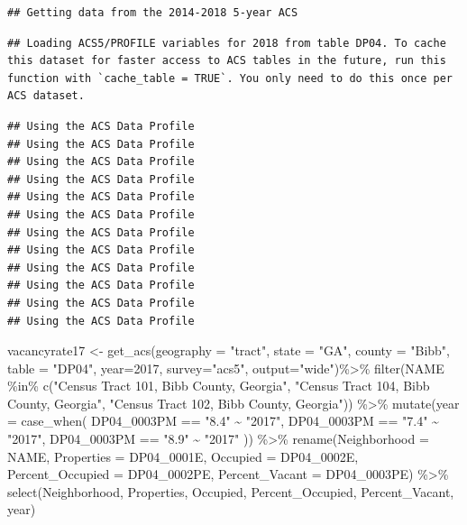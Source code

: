 \documentclass[
]{article}
\newenvironment{Shaded}{\begin{snugshade}}{\end{snugshade}}
\newcommand{\AttributeTok}[1]{\textcolor[rgb]{0.77,0.63,0.00}{#1}}
\newcommand{\DecValTok}[1]{\textcolor[rgb]{0.00,0.00,0.81}{#1}}
\newcommand{\FunctionTok}[1]{\textcolor[rgb]{0.00,0.00,0.00}{#1}}
\newcommand{\NormalTok}[1]{#1}
\newcommand{\OtherTok}[1]{\textcolor[rgb]{0.56,0.35,0.01}{#1}}
\newcommand{\SpecialCharTok}[1]{\textcolor[rgb]{0.00,0.00,0.00}{#1}}
\newcommand{\StringTok}[1]{\textcolor[rgb]{0.31,0.60,0.02}{#1}}
\begin{document}
\begin{verbatim}
## Getting data from the 2014-2018 5-year ACS
\end{verbatim}

\begin{verbatim}
## Loading ACS5/PROFILE variables for 2018 from table DP04. To cache this dataset for faster access to ACS tables in the future, run this function with `cache_table = TRUE`. You only need to do this once per ACS dataset.
\end{verbatim}

\begin{verbatim}
## Using the ACS Data Profile
## Using the ACS Data Profile
## Using the ACS Data Profile
## Using the ACS Data Profile
## Using the ACS Data Profile
## Using the ACS Data Profile
## Using the ACS Data Profile
## Using the ACS Data Profile
## Using the ACS Data Profile
## Using the ACS Data Profile
## Using the ACS Data Profile
## Using the ACS Data Profile
\end{verbatim}

\begin{Shaded}
\begin{Highlighting}[]
\NormalTok{vacancyrate17 }\OtherTok{\textless{}{-}} \FunctionTok{get\_acs}\NormalTok{(}\AttributeTok{geography =} \StringTok{"tract"}\NormalTok{, }\AttributeTok{state =} \StringTok{"GA"}\NormalTok{, }\AttributeTok{county =} \StringTok{"Bibb"}\NormalTok{, }\AttributeTok{table =} \StringTok{"DP04"}\NormalTok{,  }\AttributeTok{year=}\DecValTok{2017}\NormalTok{, }\AttributeTok{survey=}\StringTok{"acs5"}\NormalTok{, }\AttributeTok{output=}\StringTok{"wide"}\NormalTok{)}\SpecialCharTok{\%\textgreater{}\%}
\FunctionTok{filter}\NormalTok{(NAME }\SpecialCharTok{\%in\%} \FunctionTok{c}\NormalTok{(}\StringTok{"Census Tract 101, Bibb County, Georgia"}\NormalTok{, }\StringTok{"Census Tract 104, Bibb County, Georgia"}\NormalTok{, }\StringTok{"Census Tract 102, Bibb County, Georgia"}\NormalTok{)) }\SpecialCharTok{\%\textgreater{}\%}
  \FunctionTok{mutate}\NormalTok{(}\AttributeTok{year =} \FunctionTok{case\_when}\NormalTok{(}
\NormalTok{    DP04\_0003PM }\SpecialCharTok{==} \StringTok{"8.4"} \SpecialCharTok{\textasciitilde{}} \StringTok{"2017"}\NormalTok{,}
\NormalTok{    DP04\_0003PM }\SpecialCharTok{==} \StringTok{"7.4"} \SpecialCharTok{\textasciitilde{}} \StringTok{"2017"}\NormalTok{,}
\NormalTok{    DP04\_0003PM }\SpecialCharTok{==} \StringTok{"8.9"} \SpecialCharTok{\textasciitilde{}} \StringTok{"2017"}
\NormalTok{  )) }\SpecialCharTok{\%\textgreater{}\%}
  \FunctionTok{rename}\NormalTok{(}\AttributeTok{Neighborhood =}\NormalTok{ NAME,}
         \AttributeTok{Properties =}\NormalTok{ DP04\_0001E,}
         \AttributeTok{Occupied =}\NormalTok{ DP04\_0002E,}
         \AttributeTok{Percent\_Occupied =}\NormalTok{ DP04\_0002PE,}
         \AttributeTok{Percent\_Vacant =}\NormalTok{ DP04\_0003PE) }\SpecialCharTok{\%\textgreater{}\%}
   \FunctionTok{select}\NormalTok{(Neighborhood, Properties, Occupied, Percent\_Occupied, Percent\_Vacant, year) }
\end{Highlighting}
\end{Shaded}
\end{document}
